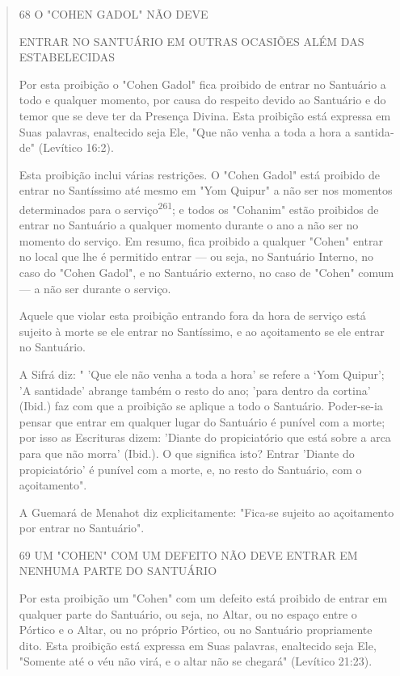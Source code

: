 \begin{quote}
68 O "COHEN GADOL" NÃO DEVE

ENTRAR NO SANTUÁRIO EM OUTRAS OCASIÕES ALÉM DAS ESTABELECIDAS

Por esta proibição o "Cohen Gadol" fica proibido de entrar no San­tuário
a todo e qualquer momento, por causa do respeito devido ao Santuário e
do temor que se deve ter da Presença Divina. Esta proibição está
expressa em Suas palavras, enaltecido seja Ele, "Que não venha a toda a
hora a santida­de" (Levítico 16:2).

Esta proibição inclui várias restrições. O "Cohen Gadol" está proi­bido
de entrar no Santíssimo até mesmo em "Yom Quipur" a não ser nos
mo­mentos determinados para o serviço\textsuperscript{261}; e todos os
"Cohanim" estão proibi­dos de entrar no Santuário a qualquer momento
durante o ano a não ser no momento do serviço. Em resumo, fica proibido
a qualquer "Cohen" entrar no local que lhe é permitido entrar --- ou
seja, no Santuário Interno, no caso do "Cohen Gadol", e no Santuário
externo, no caso de "Cohen" comum --- a não ser durante o serviço.

Aquele que violar esta proibição entrando fora da hora de serviço está
sujeito à morte se ele entrar no Santíssimo, e ao açoitamento se ele
entrar no Santuário.

A Sifrá diz: " 'Que ele não venha a toda a hora' se refere a `Yom
Qui­pur'; 'A santidade' abrange também o resto do ano; 'para dentro da
cortina'
(Ibid.) faz com que a proibição se aplique a todo o Santuário.
Poder-se-ia pen­sar que entrar em qualquer lugar do Santuário é punível
com a morte; por isso as Escrituras dizem: 'Diante do propiciatório que
está sobre a arca para que não morra' (Ibid.). O que significa isto?
Entrar 'Diante do propiciatório' é punível com a morte, e, no resto do
Santuário, com o açoitamento".

A Guemará de Menahot diz explicitamente: "Fica-se sujeito ao
açoi­tamento por entrar no Santuário".

69 UM "COHEN" COM UM DEFEITO NÃO DEVE ENTRAR EM NENHUMA PARTE DO
SANTUÁRIO

Por esta proibição um "Cohen" com um defeito está proibido de entrar em
qualquer parte do Santuário, ou seja, no Altar, ou no espaço entre o
Pórtico e o Altar, ou no próprio Pórtico, ou no Santuário propriamente
dito. Esta proibição está expressa em Suas palavras, enaltecido seja
Ele, "Somente até o véu não virá, e o altar não se chegará" (Levítico
21:23).


\end{quote}
